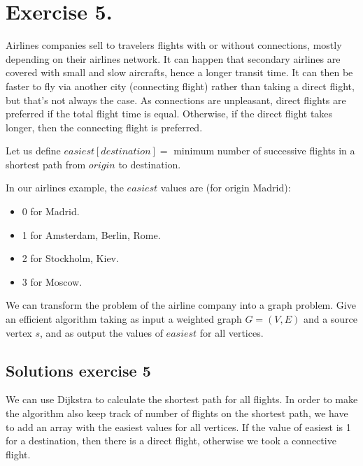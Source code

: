 \documentclass{article}
\begin{document}
\section*{Exercise 5.}


Airlines companies sell to travelers flights with or without connections, mostly depending on their airlines network.
It can happen that secondary airlines are covered with small and slow aircrafts, hence a longer transit time.
It can then be faster to fly via another city (connecting flight) rather than taking a direct flight, but that's not always the case.
As connections are unpleasant, direct flights are preferred if the total flight time is equal. Otherwise, if the direct flight takes longer, then the connecting flight is preferred.

Let us define $easiest[destination] =$ minimum number of successive flights in a shortest path from $origin$  to  destination.
\newline

In our airlines example, the $easiest$ values are (for origin Madrid):
\begin{itemize}
	\item 0 for Madrid.
	\item 1 for Amsterdam, Berlin, Rome.
	\item 2 for Stockholm, Kiev.
	\item 3 for Moscow.
\end{itemize}

We can transform the problem of the airline company into a graph problem. Give an efficient algorithm taking as input a weighted graph $G = (V,E)$ and a source vertex $s$, and as output the values of $easiest$ for all vertices.

\subsection*{Solutions exercise 5}
We can use Dijkstra to calculate the shortest path for all flights. In order to make the algorithm also keep track of number of flights on the shortest path, we have to add an array with the easiest values for all vertices. If the value of easiest is 1 for a destination, then there is a direct flight, otherwise we took a connective flight.
\end{document}
